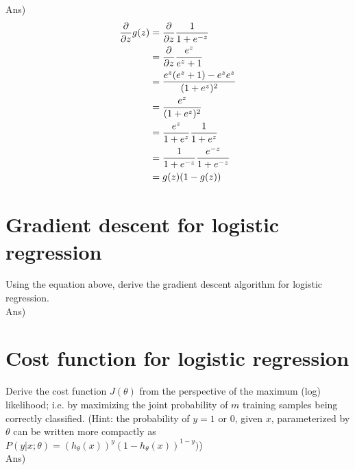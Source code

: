 \documentclass[12pt]{article}%
\begin{document}
Ans) 
\begin{equation}
	\begin{aligned}
		{\partial \over {\partial z}} g(z) & = {\partial \over {\partial z}} {1 \over {1 + e^{-z}}}\\
		& = {\partial \over {\partial z}} {e^z \over {e^z + 1}} \\
		& = {{e^z (e^z + 1) - e^z e^z} \over {(1 +e^z )^2}} \\
		& = {e^z \over {(1 +e^z )^2}} \\
		& = {e^z \over {1 +e^z }} {1 \over {1 +e^z }} \\
		& = {1 \over {1 +e^{-z} }} {e^{-z} \over {1 +e^{-z} }} \\
		& = g(z) (1 - g(z))
	\end{aligned}
\end{equation}

\section{Gradient descent for logistic regression}
Using the equation above, derive the gradient descent algorithm for logistic regression.\\

Ans)


\section{Cost function for logistic regression}
Derive the cost function $J(\theta)$ from the perspective of the maximum (log) likelihood; i.e. by maximizing the joint probability of $m$ training samples being correctly classified. (Hint: the probability of $y=1$ or $0$, given $x$, parameterized by $\theta$ can be written more compactly as $P(y | x; \theta) = (h_\theta (x))^y (1 - h_\theta (x))^{1-y} )$)\\

Ans)
\end{document}
